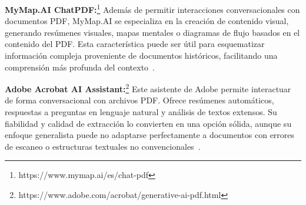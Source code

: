 \textbf{MyMap.AI ChatPDF:}\footnote{https://www.mymap.ai/es/chat-pdf} Además de permitir interacciones conversacionales con documentos PDF, MyMap.AI se especializa en la creación de contenido visual, generando resúmenes visuales, mapas mentales o diagramas de flujo basados en el contenido del PDF. Esta característica puede ser útil para esquematizar información compleja proveniente de documentos históricos, facilitando una comprensión más profunda del contexto~\cite{mymap}.

\textbf{Adobe Acrobat AI Assistant:}\footnote{https://www.adobe.com/acrobat/generative-ai-pdf.html} Este asistente de Adobe permite interactuar de forma conversacional con archivos PDF. Ofrece resúmenes automáticos, respuestas a preguntas en lenguaje natural y análisis de textos extensos. Su fiabilidad y calidad de extracción lo convierten en una opción sólida, aunque su enfoque generalista puede no adaptarse perfectamente a documentos con errores de escaneo o estructuras textuales no convencionales~\cite{acrobatai}.

